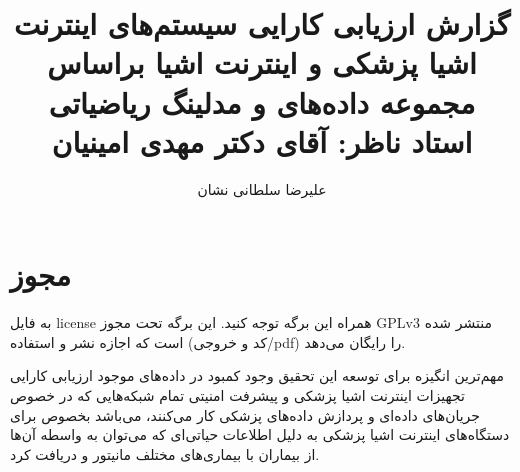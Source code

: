 \documentclass[a4paper]{article}
\title{گزارش ارزیابی کارایی سیستم‌های اینترنت اشیا پزشکی و اینترنت اشیا براساس
مجموعه داده‌های \lr{CICIoMT2024} و مدلینگ ریاضیاتی \\ استاد ناظر: آقای دکتر مهدی
امینیان}
\author{علیرضا سلطانی نشان}
\begin{document}
\maketitle
\tableofcontents

\section*{مجوز}

به فایل license همراه این برگه توجه کنید. این برگه تحت مجوز GPLv3 منتشر شده است
که اجازه نشر و استفاده (کد و خروجی/pdf) را رایگان می‌دهد.

مهم‌ترین انگیزه برای توسعه این تحقیق وجود کمبود در داده‌های موجود ارزیابی کارایی
تجهیزات اینترنت اشیا پزشکی و پیشرفت امنیتی تمام شبکه‌هایی که در خصوص جریان‌های
داده‌ای و پردازش داده‌های پزشکی کار می‌کنند، می‌باشد بخصوص برای دستگاه‌های
اینترنت اشیا پزشکی به دلیل اطلاعات حیاتی‌ای که می‌توان به واسطه آن‌ها از بیماران
با بیماری‌های مختلف مانیتور و دریافت کرد.

\newpage


\end{document}
